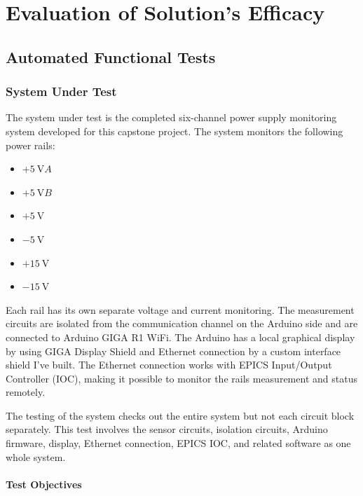 
\chapter{Evaluation of Solution’s Efficacy}
\label{chap:solution-efficacy}

\section{Automated Functional Tests}

\subsection{System Under Test}

The system under test is the completed six-channel power supply monitoring system
developed for this capstone project. The system monitors the following power rails:

\begin{itemize}
	\item \(+\SI{5}{\volt}{A}\)
	\item \(+\SI{5}{\volt}{B}\)
	\item \(+\SI{5}{\volt}\)
	\item \(-\SI{5}{\volt}\)
	\item \(+\SI{15}{\volt}\)
	\item \(-\SI{15}{\volt}\)
\end{itemize}

Each rail has its own separate voltage and current monitoring. The measurement
circuits are isolated from the communication channel on the Arduino side and are
connected to Arduino GIGA R1 WiFi. The Arduino has a local graphical display by
using GIGA Display Shield and Ethernet connection by a custom interface shield I've built.
The Ethernet connection works with EPICS Input/Output Controller (IOC), making
it possible to monitor the rails measurement and status remotely.

The testing of the system checks out the entire system but not each circuit block separately. This test involves the sensor circuits, isolation circuits, Arduino firmware, display, Ethernet connection, EPICS IOC, and related software
as one whole system.

\subsubsection{Test Objectives}

